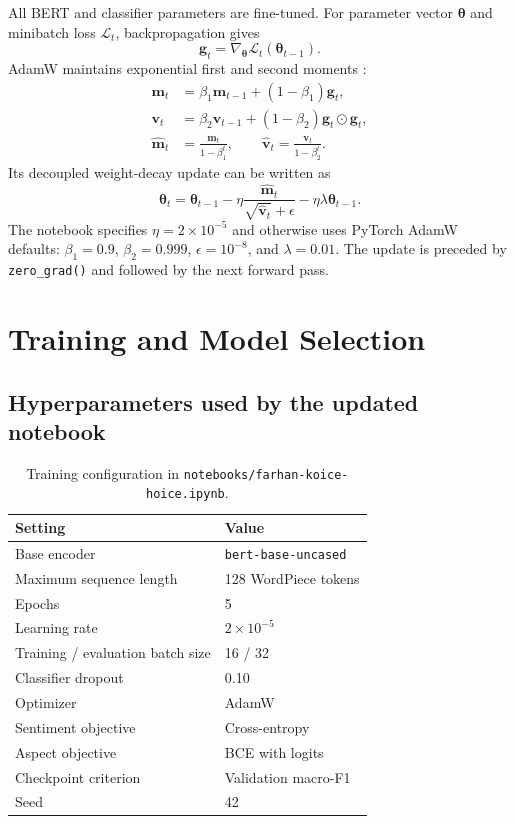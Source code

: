 \documentclass[11pt,a4paper]{report}
\newcommand{\code}[1]{\texttt{#1}}
\begin{document}
All BERT and classifier parameters are fine-tuned.  For parameter vector \(\boldsymbol\theta\) and minibatch loss \(\mathcal{L}_t\), backpropagation gives
\begin{equation}
  \mathbf{g}_t=\nabla_{\boldsymbol\theta}\mathcal{L}_t(\boldsymbol\theta_{t-1}).
\end{equation}
AdamW maintains exponential first and second moments \cite{loshchilov2019}:
\begin{align}
  \mathbf{m}_t&=\beta_1\mathbf{m}_{t-1}+(1-\beta_1)\mathbf{g}_t,\\
  \mathbf{v}_t&=\beta_2\mathbf{v}_{t-1}+(1-\beta_2)\mathbf{g}_t\odot\mathbf{g}_t,\\
  \widehat{\mathbf{m}}_t&=\frac{\mathbf{m}_t}{1-\beta_1^t},\qquad
  \widehat{\mathbf{v}}_t=\frac{\mathbf{v}_t}{1-\beta_2^t}.
\end{align}
Its decoupled weight-decay update can be written as
\begin{equation}
  \boldsymbol\theta_t=\boldsymbol\theta_{t-1}
  -\eta\frac{\widehat{\mathbf{m}}_t}{\sqrt{\widehat{\mathbf{v}}_t}+\epsilon}
  -\eta\lambda\boldsymbol\theta_{t-1}.
\end{equation}
The notebook specifies \(\eta=2\times10^{-5}\) and otherwise uses PyTorch AdamW defaults: \(\beta_1=0.9\), \(\beta_2=0.999\), \(\epsilon=10^{-8}\), and \(\lambda=0.01\).  The update is preceded by \code{zero\_grad()} and followed by the next forward pass.

\chapter{Training and Model Selection}

\section{Hyperparameters used by the updated notebook}

\begin{table}[H]
\centering
\caption{Training configuration in \code{notebooks/farhan-koice-hoice.ipynb}.}
\label{tab:hyperparameters}
\begin{tabular}{ll}
\toprule
Setting & Value \\
\midrule
Base encoder & \code{bert-base-uncased} \\
Maximum sequence length & 128 WordPiece tokens \\
Epochs & 5 \\
Learning rate & \(2\times10^{-5}\) \\
Training / evaluation batch size & 16 / 32 \\
Classifier dropout & 0.10 \\
Optimizer & AdamW \\
Sentiment objective & Cross-entropy \\
Aspect objective & BCE with logits \\
Checkpoint criterion & Validation macro-F1 \\
Seed & 42 \\
\bottomrule
\end{tabular}
\end{table}
\end{document}
